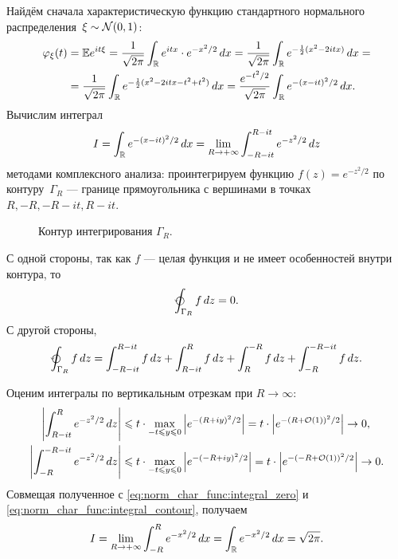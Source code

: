 \documentclass[../main.tex]{subfiles}
\begin{document}
\begin{exmpl}
 \label{example:char_func_of_normal_distribution}
 Найдём сначала характеристическую функцию стандартного нормального распределения~$ \xi \sim \mathcal N(0,1) $:
 \begin{align*}
  \varphi_\xi(t) &= \mathbb E e^{it\xi}  = \frac{1}{\sqrt{2\pi}} \int_{\mathbb{R}} e^{itx}  \cdot e^{-x^{2} / 2}\,dx = \frac{1}{\sqrt{2\pi}} \int_{\mathbb{R}} e^{-\frac{1}{2}(x^{2}-2itx)}\,dx  = \\
  &=\frac{1}{\sqrt{2\pi}} \int_{\mathbb{R}} e^{-\frac{1}{2}(x^{2}-2itx - t^{2} + t^{2})}\,dx   = \frac{e^{-t^{2} / 2}}{\sqrt{2\pi} } \int_{\mathbb{R}} e^{-(x-it)^{2} / 2} \,dx.
 \end{align*} Вычислим интеграл
 \begin{align*}
  I = \int_{\mathbb{R}} e^{-(x-it)^{2} / 2}\,dx = \lim_{R \to +\infty}  \int_{-R-it}^{R-it} e^{-z^{2} / 2}\,dz
 \end{align*} методами комплексного анализа: проинтегрируем функцию $ f(z) = e^{-z^{2} / 2} $ по контуру~$ \Gamma_R $ --- границе прямоугольника с вершинами в точках $ R, -R, -R - it, R - it $.
 \begin{figure}[ht]
  \centering
  \caption{Контур интегрирования $ \Gamma_R $.}
  \label{fig:characteristic_function_normall}
 \end{figure}

 С одной стороны, так как $ f $ --- целая функция и не имеет особенностей внутри контура, то
 \begin{align}
  \label{eq:norm_char_func:integral_zero}
  \varointctrclockwise_{\Gamma_R} f\,dz = 0.
 \end{align} С другой стороны,
 \begin{align}
  \label{eq:norm_char_func:integral_contour}
  \varointctrclockwise_{\Gamma_R} f\,dz = \int_{-R-it}^{R-it} f\,dz + \int_{R - it}^{R} f\,dz + \int_{R}^{-R} f\,dz + \int_{-R}^{-R-it} f\,dz.
 \end{align}

 Оценим интегралы по вертикальным отрезкам при $ R \to \infty $:
 \begin{align*}
  \left| \int_{R-it}^{R} e^{-z^{2} / 2}\,dz \right| &\leqslant t \cdot \max_{-t \leqslant y \leqslant 0} \left| e^{-(R+iy)^{2} / 2} \right| = t \cdot \left| e^{-(R+\mathcal{O}(1))^{2} / 2} \right| \to 0,\\
  \left| \int_{-R}^{-R-it} e^{-z^{2} / 2}\,dz \right| &\leqslant t \cdot \max_{-t \leqslant y \leqslant 0} \left| e^{-(-R+iy)^{2} / 2} \right| = t \cdot \left| e^{-(-R+\mathcal{O}(1))^{2} / 2} \right| \to 0.
 \end{align*} Совмещая полученное с \eqref{eq:norm_char_func:integral_zero} и \eqref{eq:norm_char_func:integral_contour}, получаем
 \begin{align*}
  I = \lim_{R \to +\infty}  \int_{-R}^{R} e^{-x^{2} / 2}\,dx = \int_{\mathbb{R}} e^{-x^{2} / 2}\,dx  = \sqrt{2\pi}.
 \end{align*}


\end{exmpl}
\end{document}
